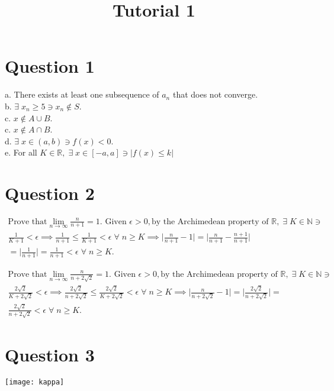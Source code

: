 \documentclass[12pt, a4paper]{article}
\title{Tutorial 1}
\newcommand{\ex}{\; \exists \;}
\newcommand{\real}{\mathbb{R}}
\newcommand{\nat}{\mathbb{N}}
\newcommand{\all}{\; \forall \;}
\newcommand{\joe}{2\sqrt{2}}
\begin{document}
\maketitle

\section{Question 1}
a. There exists at least one subsequence of $a_n$ that does not converge.\\
b. $\exists \; x_n \geq 5 \ni x_n \notin S $.\\
c. $x \notin A \cup B $.\\
c. $x \notin A \cap B $.\\
d. $\exists \; x \in (a, b) \ni f(x) < 0$.\\
e. For all $K \in \real, \ex x \in [-a, a] \ni |f(x) \leq k|$

\section{Question 2}
\begin{gather*}
\text{Prove that} \lim_{ n \to \infty } \frac{n}{n+1} = 1.
\text{ Given } \epsilon > 0, \text{by the Archimedean property of } \real,
  \ex K \in \nat  \ni \\ \frac{1}{K+1} < \epsilon 
  \implies \frac{1}{n + 1} \leq
  \frac{1}{K+1} < \epsilon \all n \geq K 
  \implies \bigg|\frac{n}{n+1} - 1\bigg| = \bigg|\frac{n}{n+1} - \frac{n+1}{n+1}\bigg|
  \\[5pt]= \bigg |\frac{1}{n+1} \bigg| = 
  \frac{1}{n+1} < \epsilon \all n \geq K.
\end{gather*}

\begin{gather*}
  \text{Prove that} \lim_{ n \to \infty } \frac{n}{n+2 \sqrt{2} } = 1.
  \text{ Given } \epsilon > 0, \text{by the Archimedean property of } \real,
  \ex K \in \nat \ni \\[5pt] \frac{\joe}{K + \joe} < \epsilon \implies 
  \frac{\joe}{n + \joe} \leq \frac{\joe}{K + \joe} < \epsilon \all n \geq K \implies
  \bigg| \frac{n}{n + \joe} - 1 \bigg| = \bigg| \frac{\joe}{n + \joe} \bigg| =\\[5pt] 
  \frac{\joe}{n + \joe} < \epsilon \all n \geq K.
\end{gather*} 

\section{Question 3}
\texttt{[image: kappa]}
\end{document}
